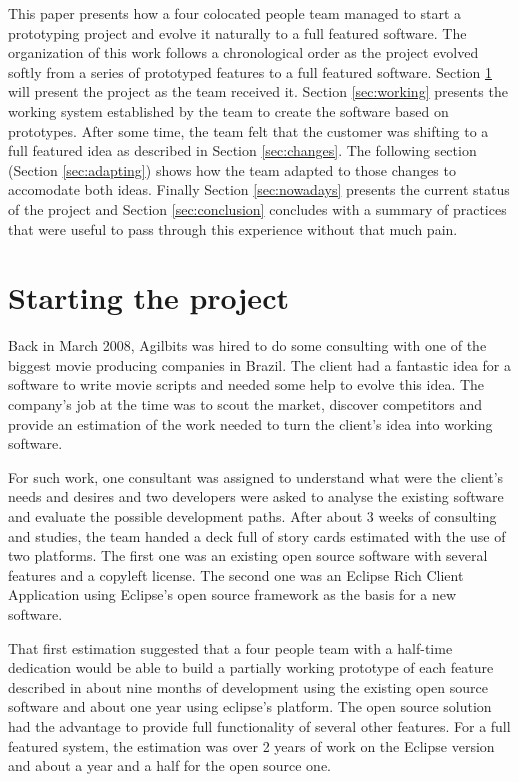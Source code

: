 \documentclass[lnbip]{svmultln}
\begin{document}
This paper presents how a four colocated people team managed to start
a prototyping project and evolve it naturally to a full featured
software. The organization of this work follows a chronological order
as the project evolved softly from a series of prototyped features to
a full featured software. Section \ref{sec:start} will present the
project as the team received it. Section \ref{sec:working} presents
the working system established by the team to create the software
based on prototypes. After some time, the team felt that the customer
was shifting to a full featured idea as described in Section
\ref{sec:changes}. The following section (Section \ref{sec:adapting})
shows how the team adapted to those changes to accomodate both
ideas. Finally Section \ref{sec:nowadays} presents the current status
of the project and Section \ref{sec:conclusion} concludes with a
summary of practices that were useful to pass through this experience
without that much pain.

\section{Starting the project}
\label{sec:start}

Back in March 2008, Agilbits was hired to do some consulting with one
of the biggest movie producing companies in Brazil. The client had a
fantastic idea for a software to write movie scripts and needed some
help to evolve this idea. The company's job at the time was to scout
the market, discover competitors and provide an estimation of the work
needed to turn the client's idea into working software.

For such work, one consultant was assigned to understand what were the
client's needs and desires and two developers were asked to analyse
the existing software and evaluate the possible development
paths. After about 3 weeks of consulting and studies, the team handed
a deck full of story cards estimated with the use of two
platforms. The first one was an existing open source software with
several features and a copyleft license. The second one was an Eclipse
Rich Client Application using Eclipse's open source framework as the
basis for a new software.

That first estimation suggested that a four people team with a
half-time dedication would be able to build a partially working
prototype of each feature described in about nine months of
development using the existing open source software and about one year
using eclipse's platform. The open source solution had the advantage
to provide full functionality of several other features.  For a full
featured system, the estimation was over 2 years of work on the
Eclipse version and about a year and a half for the open source one.
\end{document}
